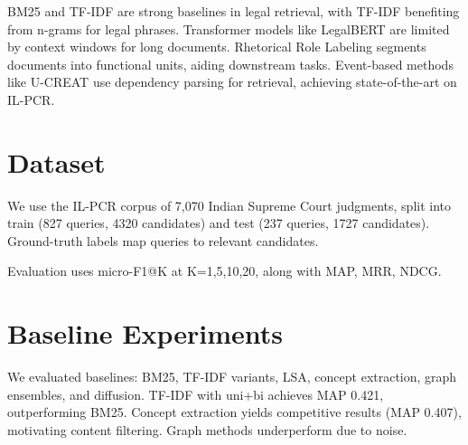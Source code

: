 \documentclass[11pt]{article}
\begin{document}
BM25 and TF-IDF are strong baselines in legal retrieval, with TF-IDF benefiting from n-grams for legal phrases.
Transformer models like LegalBERT are limited by context windows for long documents.
Rhetorical Role Labeling segments documents into functional units, aiding downstream tasks.
Event-based methods like U-CREAT use dependency parsing for retrieval, achieving state-of-the-art on IL-PCR.

\section{Dataset}

We use the IL-PCR corpus of 7,070 Indian Supreme Court judgments, split into train (827 queries, 4320 candidates) and test (237 queries, 1727 candidates).
Ground-truth labels map queries to relevant candidates.

Evaluation uses micro-F1@K at K=1,5,10,20, along with MAP, MRR, NDCG.

\section{Baseline Experiments}

We evaluated baselines: BM25, TF-IDF variants, LSA, concept extraction, graph ensembles, and diffusion.
TF-IDF with uni+bi achieves MAP 0.421, outperforming BM25.
Concept extraction yields competitive results (MAP 0.407), motivating content filtering.
Graph methods underperform due to noise.
\end{document}
